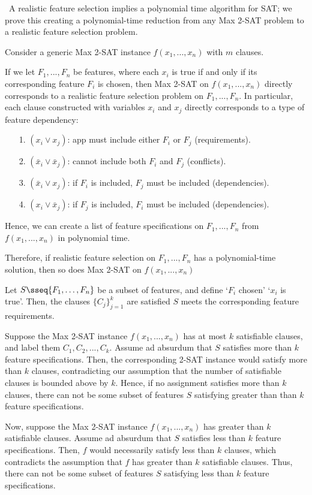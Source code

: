 \documentclass{article}
\begin{document}
\begin{solution}\
A realistic feature selection implies a polynomial time algorithm for SAT; we prove this creating a polynomial-time reduction from any Max 2-SAT problem to a realistic feature selection problem.

Consider a generic Max 2-SAT instance $f(x_1, ..., x_n)$ with $m$ clauses.

If we let $F_1, ..., F_n$ be features, where each $x_i$ is true if and only if its corresponding feature $F_i$ is chosen, then Max 2-SAT on $f(x_1, ..., x_n)$ directly corresponds to a realistic feature selection problem on $F_1, ..., F_n$. In particular, each clause constructed with variables $x_i$ and $x_j$ directly corresponds to a type of feature dependency:
\begin{enumerate}
    \item [1.] $(x_i \lor x_j)$: app must include either $F_i$ or $F_j$ (requirements).
    \item [2.] $(\bar{x}_i \lor \bar{x}_j)$: cannot include both $F_i$ and $F_j$ (conflicts).
    \item [3.] $(\bar{x}_i \lor x_j)$: if $F_i$ is included, $F_j$ must be included (dependencies).
    \item [4.] $(x_i \lor \bar{x}_j)$: if $F_j$ is included, $F_i$ must be included (dependencies).
\end{enumerate}

Hence, we can create a list of feature specifications on $F_1, ..., F_n$ from $f(x_1, ..., x_n)$ in polynomial time.

Therefore, if realistic feature selection on $F_1, ..., F_n$ has a polynomial-time solution, then so does Max 2-SAT on $f(x_1, ..., x_n)$


\begin{subproof}[Correctness.]
Let $S\sseq\{F_1,\ldots,F_n\}$ be a subset of features, and define `$F_i$ chosen' \iff `$x_i$ is true'. Then, the clauses $\{C_j\}_{j=1}^k$ are satisfied \iff $S$ meets the corresponding feature requirements.

Suppose the Max 2-SAT instance $f(x_1, ..., x_n)$ has at most $k$ satisfiable clauses, and label them $C_1, C_2, ..., C_k$.
Assume ad absurdum that $S$ satisfies more than $k$ feature specifications. Then, the corresponding 2-SAT instance would satisfy more than $k$ clauses, contradicting our assumption that the number of satisfiable clauses is bounded above by $k$. Hence, if no assignment satisfies more than $k$ clauses, there can not be some subset of features $S$ satisfying greater than than $k$ feature specifications.

Now, suppose the Max 2-SAT instance $f(x_1, ..., x_n)$ has greater than $k$ satisfiable clauses.
Assume ad absurdum that $S$ satisfies less than $k$ feature specifications.
Then, $f$ would necessarily satisfy less than $k$ clauses, which contradicts the assumption that $f$ has greater than $k$ satisfiable clauses.
Thus, there can not be some subset of features $S$ satisfying less than $k$ feature specifications.
\end{subproof}
\end{solution}
\end{document}
